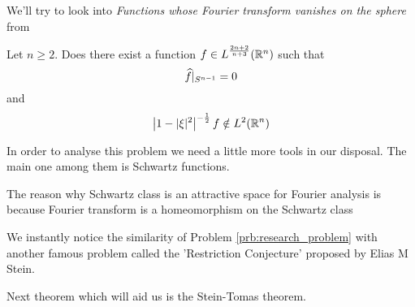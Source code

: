 We'll try to look into \emph{Functions whose Fourier transform vanishes on the sphere} from \autocite[Problem no. 3]{Grafakos2017a}

\begin{problem}
\label{prb:research_problem}
Let $n \ge 2$. Does there exist a function $f \in L^{\frac{2n+2}{n+3}}(\mathbb R^n)$ such that $$\widehat{f}\vert_{S^{n-1}} = 0$$
and
$$\left| 1 - |\xi|^2\right|^{-\frac{1}{2}}f \notin L^2(\mathbb R^n)$$
\end{problem}

In order to analyse this problem we need a little more tools in our disposal. The main one among them is Schwartz functions. 

The reason why Schwartz class is an attractive space for Fourier analysis is because Fourier transform is a homeomorphism on the Schwartz class \autocite[Corollary 2.2.15]{Grafakos_Classical_Fourier}

We instantly notice the similarity of Problem \autoref{prb:research_problem} with another famous problem called the 'Restriction Conjecture' proposed by Elias M Stein.

\begin{problem}

\end{problem}

Next theorem which will aid us is the Stein-Tomas theorem. 
